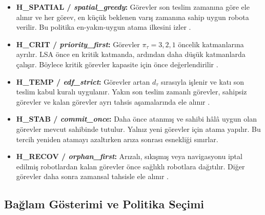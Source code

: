 \documentclass[10pt,letterpaper,onecolumn]{IEEEtran}
\begin{document}
\begin{itemize}
  \item \textbf{H\_SPATIAL / \emph{spatial\_greedy}:} Görevler son teslim
  zamanına göre ele alınır ve her görev, en küçük beklenen varış zamanına sahip
  uygun robota verilir. Bu politika en-yakın-uygun atama ilkesini izler
  \cite{khamis2015multi,dutta2019task}.

  \item \textbf{H\_CRIT / \emph{priority\_first}:} Görevler
  $\pi_\tau=3,2,1$ öncelik katmanlarına ayrılır. LSA önce en kritik katmanda,
  ardından daha düşük katmanlarda çalışır. Böylece kritik görevler kapasite
  için önce değerlendirilir \cite{choi2009consensus,zhang2023auction}.

  \item \textbf{H\_TEMP / \emph{edf\_strict}:} Görevler artan $d_\tau$
  sırasıyla işlenir ve katı son teslim kabul kuralı uygulanır. Yakın son teslim
  zamanlı görevler, sahipsiz görevler ve kalan görevler ayrı tahsis
  aşamalarında ele alınır \cite{ghassemi2022bigmrta,chen2019critical}.

  \item \textbf{H\_STAB / \emph{commit\_once}:} Daha önce atanmış ve sahibi
  hâlâ uygun olan görevler mevcut sahibinde tutulur. Yalnız yeni görevler için
  atama yapılır. Bu tercih yeniden atamayı azaltırken arıza sonrası esnekliği
  sınırlar.

  \item \textbf{H\_RECOV / \emph{orphan\_first}:} Arızalı, sıkışmış veya
  navigasyonu iptal edilmiş robotlardan kalan görevler önce sağlıklı robotlara
  dağıtılır. Diğer görevler daha sonra zamansal tahsisle ele alınır
  \cite{rostam2024selfadaptive,dutta2019task}.
\end{itemize}



\subsection{Bağlam Gösterimi ve Politika Seçimi}
\label{sec:context}
\end{document}
